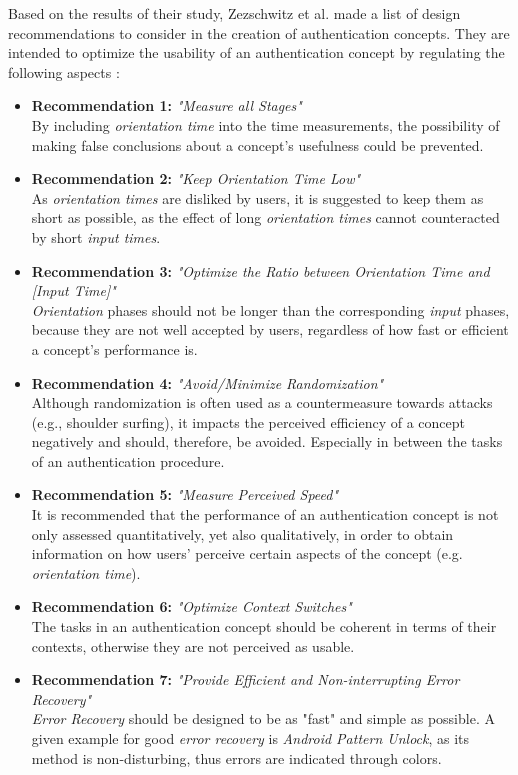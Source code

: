 Based on the results of their study, Zezschwitz et al. \cite{Zezschwitz} made a list of design recommendations to consider in the creation of authentication concepts. They are intended to optimize the usability of an authentication concept by regulating the following aspects \cite{Zezschwitz}:

\begin{itemize}
    \item \textbf{Recommendation 1:} \textit{"Measure all Stages"}\\
    By including \textit{orientation time} into the time measurements, the possibility of making false conclusions about a concept's usefulness could be prevented.
    \item \textbf{Recommendation 2:} \textit{"Keep Orientation Time Low"}\\
    As \textit{orientation times} are disliked by users, it is suggested to keep them as short as possible, as the effect of long \textit{orientation times} cannot counteracted by short \textit{input times}.
    \item \textbf{Recommendation 3:} \textit{"Optimize the Ratio between Orientation Time and [Input Time]"} \\
    \textit{Orientation} phases should not be longer than the corresponding \textit{input} phases, because they are not well accepted by users, regardless of how fast or efficient a concept's performance is.
    \item \textbf{Recommendation 4:} \textit{"Avoid/Minimize Randomization"}\\ 
    Although randomization is often used as a countermeasure towards attacks (e.g., shoulder surfing), it impacts the perceived efficiency of a concept negatively and should, therefore, be avoided. Especially in between the tasks of an authentication procedure.
    \item \textbf{Recommendation 5:} \textit{"Measure Perceived Speed"}\\
    It is recommended that the performance of an authentication concept is not only assessed quantitatively, yet also qualitatively, in order to obtain information on how users' perceive certain aspects of the concept (e.g. \textit{orientation time}).  
    \item \textbf{Recommendation 6:} \textit{"Optimize Context Switches"}\\
    The tasks in an authentication concept should be coherent in terms of their contexts, otherwise they are not perceived as usable. 
    \item \textbf{Recommendation 7:} \textit{"Provide Efficient and Non-interrupting Error Recovery"}\\
    \textit{Error Recovery} should be designed to be as "fast" and simple as possible. A given example for good \textit{error recovery} is \textit{Android Pattern Unlock}, as its method is non-disturbing, thus errors are indicated through colors.  
    
    
\end{itemize}


